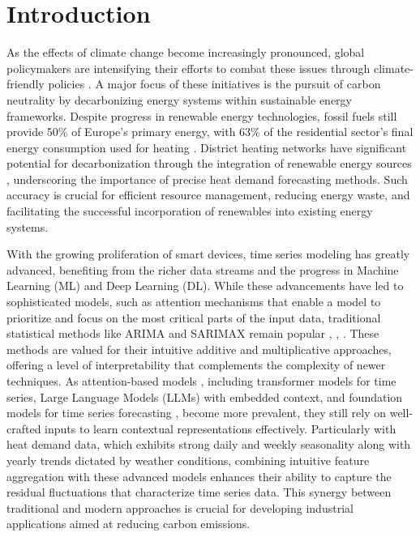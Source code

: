 \section{Introduction}


As the effects of climate change become increasingly pronounced, global policymakers are intensifying their efforts to combat these issues through climate-friendly policies \cite{european2012energy}. A major focus of these initiatives is the pursuit of carbon neutrality by decarbonizing energy systems within sustainable energy frameworks. Despite progress in renewable energy technologies, fossil fuels still provide 50\% of Europe’s primary energy, with 63\% of the residential sector's final energy consumption used for heating \cite{paardekooper2018heat}. District heating networks have significant potential for decarbonization through the integration of renewable energy sources \cite{steiner2015district}, underscoring the importance of precise heat demand forecasting methods. Such accuracy is crucial for efficient resource management, reducing energy waste, and facilitating the successful incorporation of renewables into existing energy systems.


With the growing proliferation of smart devices, time series modeling has greatly advanced, benefiting from the richer data streams and the progress in Machine Learning (ML) and Deep Learning (DL). While these advancements have led to sophisticated models, such as attention mechanisms that enable a model to prioritize and focus on the most critical parts of the input data, traditional statistical methods like ARIMA and SARIMAX remain popular \cite{DOTZAUER2002277}, \cite{FANG2016544}, \cite{chatterjee2021prediction}. These methods are valued for their intuitive additive and multiplicative approaches, offering a level of interpretability that complements the complexity of newer techniques. As attention-based models \cite{vaswani2023attentionneed}, including transformer models for time series, Large Language Models (LLMs) with embedded context, and foundation models for time series forecasting \cite{das2024decoderonlyfoundationmodeltimeseries}, become more prevalent, they still rely on well-crafted inputs to learn contextual representations effectively. Particularly with heat demand data, which exhibits strong daily and weekly seasonality along with yearly trends dictated by weather conditions, combining intuitive feature aggregation with these advanced models enhances their ability to capture the residual fluctuations that characterize time series data. This synergy between traditional and modern approaches is crucial for developing industrial applications aimed at reducing carbon emissions.

